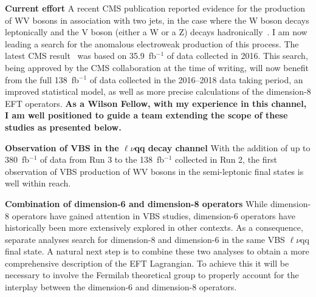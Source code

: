 {\begin{flushleft}
\textbf{Current effort}
A recent CMS publication reported evidence for the production of WV bosons in association with two jets, in the case where the W boson decays leptonically and the V boson (either a W or a Z) decays hadronically~\cite{[1]}. I am now leading a search for the anomalous electroweak production of this process. The latest CMS result~\cite{[2]} was based on 35.9~fb$^{-1}$ of data collected in 2016. This search, being approved by the CMS collaboration at the time of writing, will now benefit from the full 138~fb$^{-1}$ of data collected in the 2016--2018 data taking period, an improved statistical model, as well as more precise calculations of the dimension-8 EFT operators. {\bf As a Wilson Fellow, with my experience in this channel, I am well positioned to guide a team extending the scope of these studies as presented below.}

\textbf{Observation of VBS in the $\ell\nu$qq decay channel} With the addition of up to 380~fb$^{-1}$ of data from Run 3 to the 138~fb$^{-1}$ collected in Run 2, the first observation of VBS production of WV bosons in the semi-leptonic final states is well within reach.

\textbf{Combination of dimension-6 and dimension-8 operators} While dimension-8 operators have gained attention in VBS studies, dimension-6 operators have historically been more extensively explored in other contexts. As a consequence, separate analyses search for dimension-8 and dimension-6 in the same VBS $\ell\nu$qq final state. A natural next step is to combine these two analyses to obtain a more comprehensive description of the EFT Lagrangian. To achieve this it will be necessary to involve the Fermilab theoretical group to properly account for the interplay between the dimension-6 and dimension-8 operators.


\end{flushleft}}
